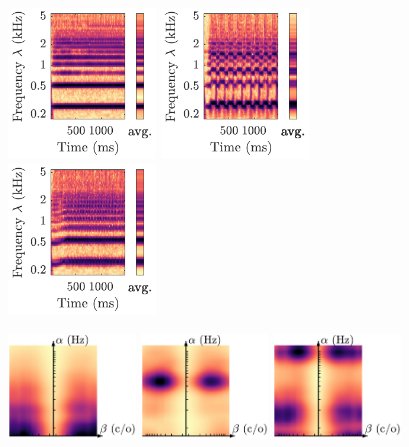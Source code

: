 \documentclass{bmcart}
\begin{document}
\begin{backmatter}
\begin{figure}
\includegraphics[height=4cm]{figures/flute_scattering/Fl-ord-C4-mf_scalogram.pdf}
\hspace{8mm}
\includegraphics[trim=35 0 0 0, clip, height=4cm]{figures/flute_scattering/Fl-trill-maj2-C4-mf_scalogram.pdf}
\hspace{12mm}
\includegraphics[trim=35 0 0 0, clip, height=4cm]{figures/flute_scattering/Fl-ply+sng-Csharp4+C4-mf_scalogram.pdf}

\hspace{2mm}
\includegraphics[height=28mm]{figures/flute_scattering/Fl-ord-C4-mf_scattering.pdf}
\hspace{5mm}
\includegraphics[height=28mm]{figures/flute_scattering/Fl-trill-maj2-C4-mf_scattering.pdf}
\hspace{5mm}
\includegraphics[trim=0 0 77 0, clip, height=28mm]{figures/flute_scattering/Fl-ply+sng-Csharp4+C4-mf_scattering.pdf}


\end{figure}
\end{backmatter}
\end{document}
